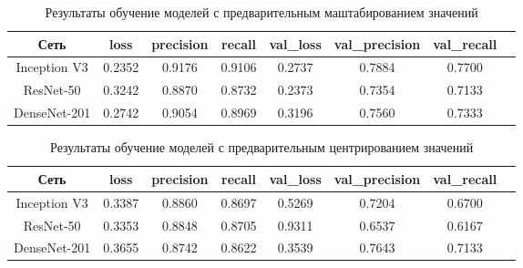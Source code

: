 \begin{table}[H]
    \centering
    \caption{Результаты обучение моделей с предварительным маштабированием значений} \label{rescale}
    \begin{tabular}{|c|c|c|c|c|c|c|c|}
        \hline    
        Сеть          & loss   & precision & recall & val\_loss & val\_precision & val\_recall \\ %
        \hline
        Inception V3  & 0.2352 & 0.9176    & 0.9106 & 0.2737   & 0.7884        & 0.7700 \\ %
        \hline
        ResNet-50     & 0.3242 & 0.8870    & 0.8732 & 0.2373    & 0.7354         & 0.7133 \\ %
        \hline
        DenseNet-201  & 0.2742 & 0.9054    & 0.8969 & 0.3196    & 0.7560         & 0.7333 \\ %
        \hline
      \end{tabular}
\end{table}

\begin{table}[H]
    \centering
    \caption{Результаты обучение моделей с предварительным центрированием значений} \label{samplewise}    
    \begin{tabular}{|c|c|c|c|c|c|c|c|}
        \hline    
        Сеть          & loss   & precision & recall & val\_loss & val\_precision & val\_recall \\ %
        \hline
        Inception V3  & 0.3387 & 0.8860    & 0.8697 & 0.5269    & 0.7204         & 0.6700 \\ %
        \hline
        ResNet-50     & 0.3353  & 0.8848   & 0.8705 & 0.9311   & 0.6537        & 0.6167 \\ %
        \hline
        DenseNet-201  & 0.3655  & 0.8742   & 0.8622 & 0.3539   & 0.7643        & 0.7133 \\ %
        \hline
      \end{tabular}
\end{table}




